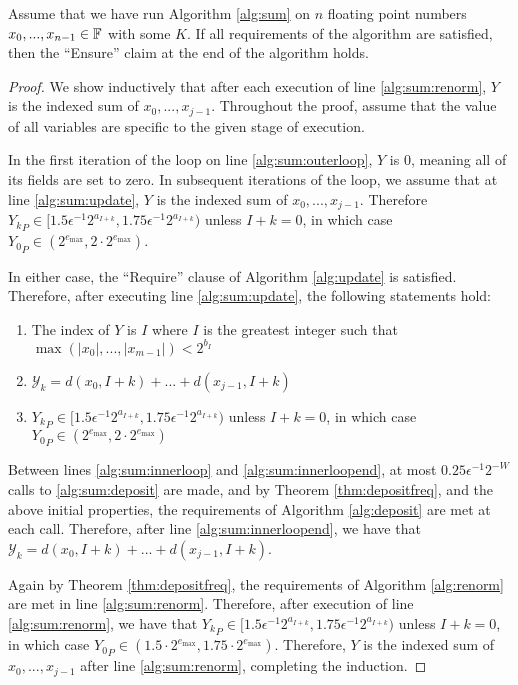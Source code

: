     \begin{samepage}
    \begin{thm}
      Assume that we have run Algorithm \ref{alg:sum} on $n$ floating point numbers $x_0, ..., x_{n - 1} \in \mathbb{F}$ with some $K$. If all requirements of the algorithm are satisfied, then the ``Ensure'' claim at the end of the algorithm holds.
      \label{thm:sum}
    \end{thm}
    \end{samepage}
    \begin{proof}
      We show inductively that after each execution of line \ref{alg:sum:renorm}, $Y$ is the indexed sum of $x_0, ..., x_{j - 1}$. Throughout the proof, assume that the value of all variables are specific to the given stage of execution.

      In the first iteration of the loop on line \ref{alg:sum:outerloop}, $Y$ is 0, meaning all of its fields are set to zero.
      In subsequent iterations of the loop, we assume that at line \ref{alg:sum:update}, $Y$ is the indexed sum of $x_0, ..., x_{j - 1}$. Therefore ${Y_k}_P \in [1.5  \epsilon^{-1} 2^{a_{I + k}}, 1.75  \epsilon^{-1} 2^{a_{I + k}})$ unless $I + k = 0$, in which case ${Y_0}_P \in (2^{e_{\max}}, 2 \cdot 2^{e_{\max}})$.

      In either case, the ``Require'' clause of Algorithm \ref{alg:update} is satisfied. Therefore, after executing line \ref{alg:sum:update}, the following statements hold:
      \begin{enumerate}
      \item
        The index of $Y$ is $I$ where $I$ is the greatest integer such that $\max(|x_0|, ..., |x_{m - 1}|) < 2^{b_I}$
      \item
        $\mathcal{Y}_k = d(x_0, I + k) + ... + d(x_{j - 1}, I + k)$
      \item
        \Statex ${Y_k}_P \in [1.5  \epsilon^{-1} 2^{a_{I + k}}, 1.75  \epsilon^{-1} 2^{a_{I + k}})$ unless $I + k = 0$, in which case ${Y_0}_P \in (2^{e_{\max}}, 2 \cdot 2^{e_{\max}})$
      \end{enumerate}
      Between lines \ref{alg:sum:innerloop} and \ref{alg:sum:innerloopend}, at most $0.25\epsilon^{-1}2^{-W}$ calls to \ref{alg:sum:deposit} are made, and by Theorem \ref{thm:depositfreq}, and the above initial properties, the requirements of Algorithm \ref{alg:deposit} are met at each call. Therefore, after line \ref{alg:sum:innerloopend}, we have that $\mathcal{Y}_k = d(x_0, I + k) + ... + d(x_{j-1}, I + k)$.

      Again by Theorem \ref{thm:depositfreq}, the requirements of Algorithm \ref{alg:renorm} are met in line \ref{alg:sum:renorm}. Therefore, after execution of line \ref{alg:sum:renorm}, we have that ${Y_k}_P \in [1.5  \epsilon^{-1} 2^{a_{I + k}}, 1.75  \epsilon^{-1} 2^{a_{I + k}})$ unless $I + k = 0$, in which case ${Y_0}_P \in (1.5 \cdot 2^{e_{\max}}, 1.75 \cdot 2^{e_{\max}})$. Therefore, $Y$ is the indexed sum of $x_0, ..., x_{j - 1}$ after line \ref{alg:sum:renorm}, completing the induction.
    \end{proof}
